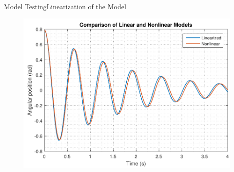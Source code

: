 \begin{frame}{Model Testing}{Linearization of the Model}
\begin{minipage}{\linewidth}
\begin{minipage}{0.45\linewidth}
\begin{figure}[H]
        \includegraphics[scale=0.33]{Pictures/LinearizedVSNonlinear_0}
      \end{figure}
    \end{minipage}
  \end{minipage}
\end{frame}

